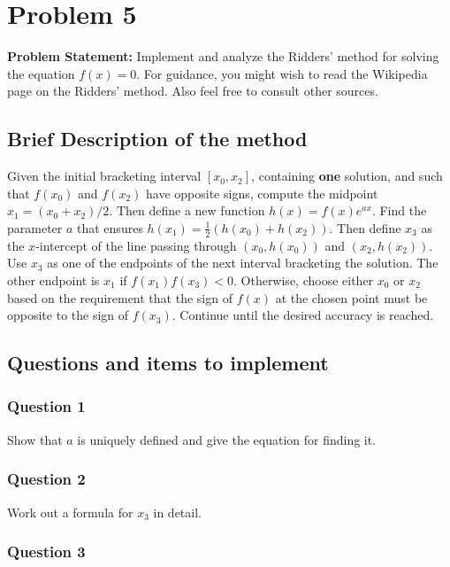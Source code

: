 \clearpage
\section*{Problem 5}

\textbf{Problem Statement:} Implement and analyze the Ridders' method for solving the equation $f(x) = 0$. For guidance, you might wish to read the Wikipedia page on the Ridders' method. Also feel free to consult other sources.

\subsection*{Brief Description of the method}

Given the initial bracketing interval $[x_0, x_2]$, containing \textbf{one} solution, and such that $f(x_0)$ and $f(x_2)$ have opposite signs, compute the midpoint $x_1 = (x_0 + x_2)/2$. Then define a new function $h(x) = f(x)e^{ax}$. Find the parameter $a$ that ensures $h(x_1) = \frac{1}{2}(h(x_0) + h(x_2))$. Then define $x_3$ as the $x$-intercept of the line passing through $(x_0, h(x_0))$ and $(x_2, h(x_2))$. Use $x_3$ as one of the endpoints of the next interval bracketing the solution. The other endpoint is $x_1$ if $f(x_1)f(x_3) < 0$. Otherwise, choose either $x_0$ or $x_2$ based on the requirement that the sign of $f(x)$ at the chosen point must be opposite to the sign of $f(x_3)$. Continue until the desired accuracy is reached.

\subsection*{Questions and items to implement}

\subsubsection*{Question 1}

Show that $a$ is uniquely defined and give the equation for finding it.

\subsubsection*{Question 2}

Work out a formula for $x_3$ in detail.

\subsubsection*{Question 3}


